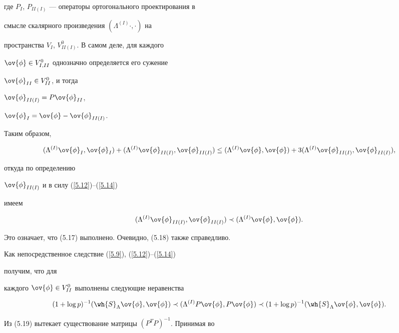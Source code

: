 где $P_I$, $P_{II(I)}$ --- операторы ортогонального проектирования в 


смысле скалярного произведения $(\Lambda^{(I)}\cdot,\cdot)$ на 


пространства $V_I$, $V_{II(I)}^0$. В самом деле, для каждого 


$\ov{\phi} \in V_{I,II}^0$ однозначно определяется его сужение 


$\ov{\phi}_{II}\in V^0_{II}$, и тогда 


$\ov{\phi}_{II(I)} = P\ov{\phi}_{II}$,


$\ov{\phi}_I = \ov{\phi}-\ov{\phi}_{II(I)}$. 


Таким образом, 


$$


(\Lambda^{(I)}\ov{\phi}_I,\ov{\phi}_I) +


(\Lambda^{(I)}\ov{\phi}_{II(I)},\ov{\phi}_{II(I)}) \leq 


(\Lambda^{(I)}\ov{\phi},\ov{\phi}) +


3(\Lambda^{(I)}\ov{\phi}_{II(I)},\ov{\phi}_{II(I)}),


$$


откуда по определению


$\ov{\phi}_{II(I)}$ и в силу (\ref{5.12})--(\ref{5.14}) 


имеем


$$


(\Lambda^{(I)}\ov{\phi}_{II(I)},\ov{\phi}_{II(I)}) \prec


(\Lambda^{(I)}\ov{\phi},\ov{\phi}).


$$


Это означает, что (5.17) выполнено. Очевидно, (5.18) также справедливо.


Как непосредственное следствие (\ref{5.9}), (\ref{5.12})--(\ref{5.14})


получим, что для 


каждого $\ov{\phi} \in V^0_{II}$ выполнены следующие неравенства


\begin{equation}\label{eq19}


(1+\log p)^{-1}(\wh{S}_\Lambda\ov{\phi},\ov{\phi}) \prec


(\Lambda^{(I)}P\ov{\phi},P\ov{\phi}) \prec (1+\log p)^{-1}


(\wh{S}_\Lambda\ov{\phi},\ov{\phi}).


\end{equation}


Из (5.19) вытекает существование матрицы $(P^TP)^{-1}$. Принимая во 


